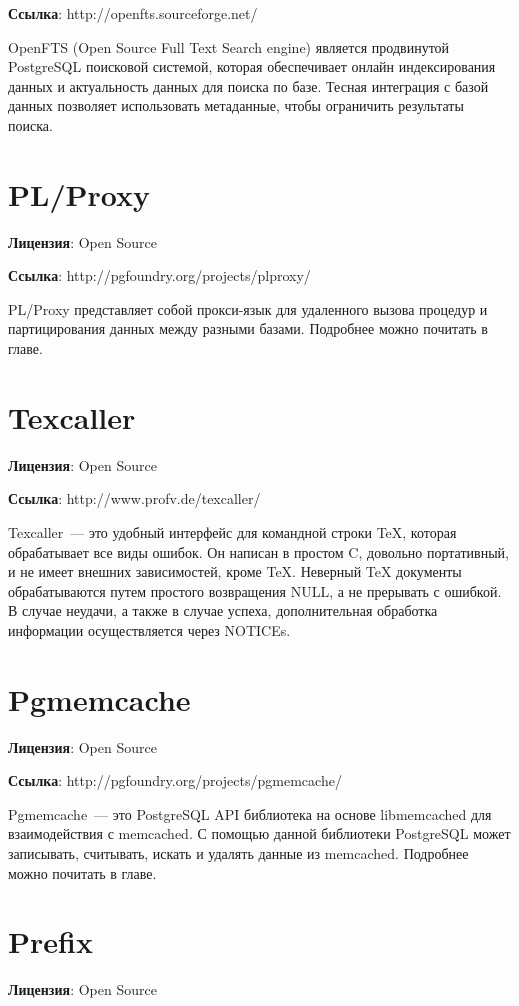 \textbf{Ссылка}: http://openfts.sourceforge.net/

OpenFTS (Open Source Full Text Search engine) является продвинутой PostgreSQL поисковой системой, которая обеспечивает 
онлайн индексирования данных и актуальность данных для поиска по базе. Тесная интеграция с базой данных позволяет использовать метаданные, 
чтобы ограничить результаты поиска.

\section{PL/Proxy}
\textbf{Лицензия}: Open Source

\textbf{Ссылка}: http://pgfoundry.org/projects/plproxy/

PL/Proxy представляет собой прокси-язык для удаленного вызова процедур и партицирования данных между разными базами. 
Подробнее можно почитать в  главе.

\section{Texcaller}
\textbf{Лицензия}: Open Source

\textbf{Ссылка}: http://www.profv.de/texcaller/

Texcaller~--- это удобный интерфейс для командной строки TeX, которая обрабатывает все виды ошибок. Он написан в простом C, довольно портативный, 
и не имеет внешних зависимостей, кроме TeX. Неверный TeX документы обрабатываются путем простого возвращения NULL, 
а не прерывать с ошибкой. В случае неудачи, а также в случае успеха, дополнительная обработка информации осуществляется через NOTICEs.

\section{Pgmemcache}
\textbf{Лицензия}: Open Source

\textbf{Ссылка}: http://pgfoundry.org/projects/pgmemcache/

Pgmemcache~--- это PostgreSQL API библиотека на основе libmemcached для взаимодействия с memcached. С помощью данной библиотеки 
PostgreSQL может записывать, считывать, искать и удалять данные из memcached. Подробнее можно почитать в  главе.

\section{Prefix}
\textbf{Лицензия}: Open Source

